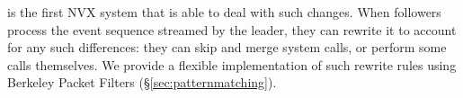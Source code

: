
\varan is the first NVX system that is able to deal with such changes.
When followers process the event sequence streamed by the leader, they
can rewrite it to account for any such differences: \eg they can skip
and merge system calls, or perform some calls themselves.  We provide
a flexible implementation of such rewrite rules using Berkeley Packet
Filters (\S\ref{sec:patternmatching}).


